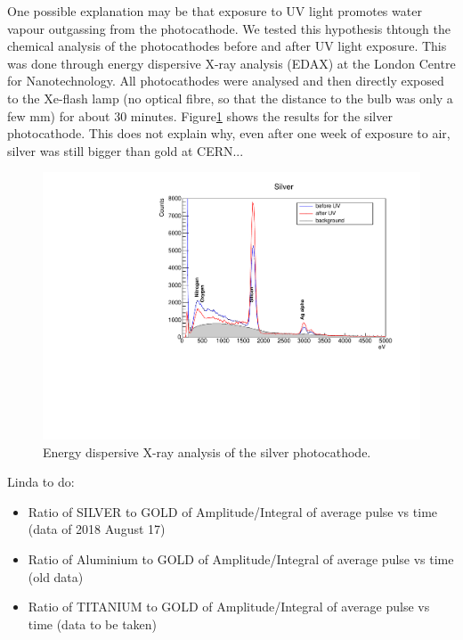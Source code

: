 \documentclass[a4paper,11pt]{article}
\begin{document}
One possible explanation may be that exposure to UV light promotes water vapour outgassing from the photocathode. We tested this hypothesis thtough the chemical analysis of the photocathodes before and after UV light exposure. This was done through energy dispersive X-ray analysis (EDAX) at the London Centre for Nanotechnology. All photocathodes were analysed and then directly exposed to the Xe-flash lamp (no optical fibre, so that the distance to the bulb was only a few mm) for about 30 minutes. 
Figure\ref{fig:EDAX} shows the results for the silver photocathode. This does not explain why, even after one week of exposure to air, silver was still bigger than gold at CERN...
\begin{figure}[t]
    \centering
    \includegraphics[width=.8\linewidth]{figures/SilverEDAX.pdf}
    \caption{Energy dispersive X-ray analysis of the silver photocathode.}
    \label{fig:EDAX}
\end{figure}

Linda to do:
\begin{itemize}
    \item Ratio of SILVER to GOLD of Amplitude/Integral of average pulse vs time (data of 2018 August 17) 
    \item Ratio of Aluminium to GOLD of Amplitude/Integral of average pulse vs time (old data) 
    \item Ratio of TITANIUM to GOLD of Amplitude/Integral of average pulse vs time (data to be taken)
\end{itemize}

\end{document}
